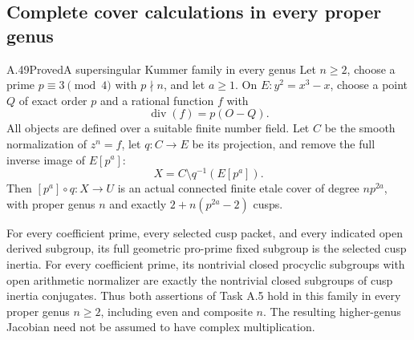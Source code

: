 \subsection{Complete cover calculations in every proper genus}

\begin{statement}{A.49}{Proved}{A supersingular Kummer family in every genus}
Let \(n\ge2\), choose a prime \(p\equiv3\pmod4\)
with \(p\nmid n\), and let \(a\ge1\). On
\(E:y^2=x^3-x\), choose a point \(Q\) of exact
order \(p\) and a rational function \(f\) with
\[
                         \operatorname{div}(f)=p(O-Q).
                                                               \tag{A.49.1}
\]
All objects are defined over a suitable finite number
field. Let \(C\) be the smooth normalization of
\(z^n=f\), let \(q:C\to E\) be its projection,
and remove the full inverse image of \(E[p^a]\):
\[
                  X=C\setminus q^{-1}(E[p^a]).       \tag{A.49.2}
\]
Then \([p^a]\circ q:X\to U\) is an actual
connected finite etale cover of degree \(np^{2a}\),
with proper genus \(n\) and exactly
\(2+n(p^{2a}-2)\) cusps.

For every coefficient prime, every selected cusp
packet, and every indicated open derived subgroup,
its full geometric pro-prime fixed subgroup is the
selected cusp inertia. For every coefficient prime,
its nontrivial closed procyclic subgroups with open
arithmetic normalizer are exactly the nontrivial
closed subgroups of cusp inertia conjugates.
Thus both assertions of Task A.5 hold in this family
in every proper genus \(n\ge2\), including even
and composite \(n\). The resulting higher-genus
Jacobian need not be assumed to have complex
multiplication.
\end{statement}

